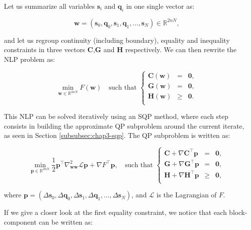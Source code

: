 Let us summarize all variables $\mathbf{s}_i$ and $\mathbf{q}_i$ in
one single vector as:

\begin{equation}
\mathbf{w}=(\mathbf{s}_0,\mathbf{q}_0,\mathbf{s}_1,\mathbf{q}_1,\ldots,\mathbf{s}_N)
\in \mathbb R^{2nN},
\end{equation} 

and let us regroup continuity (including boundary), equality and
inequality constraints in three vectors $\mathbf{C}$,$\mathbf{G}$ and
$\mathbf{H}$ respectively. We can then rewrite the NLP problem as:

\begin{equation}
  \min_{\mathbf{w}\in\mathbb R^{2nN}}F(\mathbf{w}) \quad\text{such that }
  \left\{
    \begin{array}{rcl}
      \mathbf{C}(\mathbf{w}) &=& \mathbf{0},\\
      \mathbf{G}(\mathbf{w}) &=& \mathbf{0},\\
      \mathbf{H}(\mathbf{w}) &\ge& \mathbf{0}.\\
    \end{array}
    \right.
\end{equation}

This NLP can be solved iteratively using an SQP method, where each
step consists in building the approximate QP subproblem around the
current iterate, as seen in Section \ref{subsubsec:chap3-sqp}. The QP
subproblem is written as:

\begin{equation}
  \min_{\mathbf{p}\in\mathbb R^{2nN}}
  \frac{1}{2}\mathbf{p}^\top\nabla^2_{\mathbf{w}\mathbf{w}}\mathcal{L}\mathbf{p} + \nabla
  F^\top\mathbf{p},
  \quad \text{such that }
  \left\{\begin{array}{rcl}
  \mathbf{C} + \nabla \mathbf{C}^\top\mathbf{p} &=& \mathbf{0},\\
  \mathbf{G} + \nabla \mathbf{G}^\top\mathbf{p} &=& \mathbf{0},\\
  \mathbf{H} + \nabla \mathbf{H}^\top\mathbf{p} &\ge& \mathbf{0},\\
  \end{array}\right.
\end{equation}

where $\mathbf{p}=
(\Delta\mathbf{s}_0,\Delta\mathbf{q}_0,\Delta\mathbf{s}_1,\Delta\mathbf{q}_1,\ldots,\Delta\mathbf{s}_N)$,
and $\mathcal{L}$ is the Lagrangian of $F$.

If we give a closer look at the first equality constraint, we notice
that each block-component can be written as:


